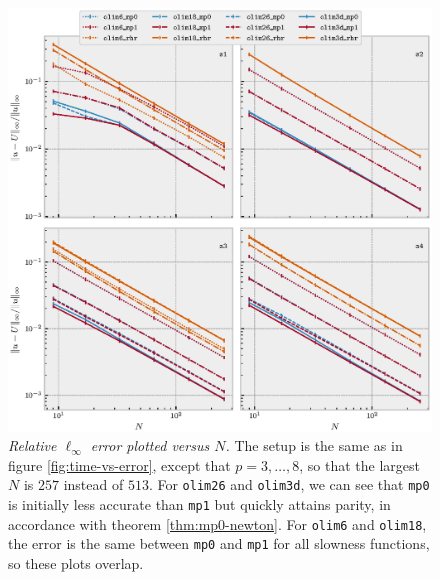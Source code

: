\documentclass[smallcondensed]{svjour3}
\begin{document}
\begin{figure}
  \centering \includegraphics[width=\linewidth]{size_vs_error_3d.eps}
  \caption{\emph{Relative $\ell_\infty$ error plotted versus $N$.} The
    setup is the same as in figure \ref{fig:time-vs-error}, except
    that $p = 3, \hdots, 8$, so that the largest $N$ is $257$ instead
    of $513$. For \texttt{olim26} and \texttt{olim3d}, we can see that
    \texttt{mp0} is initially less accurate than \texttt{mp1} but
    quickly attains parity, in accordance with theorem
    \ref{thm:mp0-newton}. For \texttt{olim6} and \texttt{olim18}, the
    error is the same between \texttt{mp0} and \texttt{mp1} for all
    slowness functions, so these plots
    overlap.}\label{fig:size-vs-error}
\end{figure}
\end{document}
